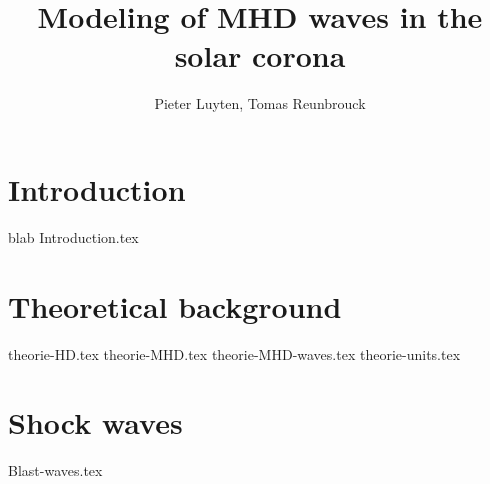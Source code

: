 \documentclass[a4paper]{article}
\title{Modeling of MHD waves in the solar corona}
\author{Pieter Luyten, Tomas Reunbrouck}
\begin{document}
\maketitle
\newpage
\tableofcontents
\newpage

\section{Introduction}
blab
{Introduction.tex}
\cite{notes-fluid-dynamics}

\section{Theoretical background}
{theorie-HD.tex}
{theorie-MHD.tex}
{theorie-MHD-waves.tex}
{theorie-units.tex}

\section{Shock waves}
{Blast-waves.tex}

\end{document}
